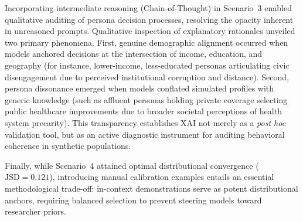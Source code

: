 Incorporating intermediate reasoning (Chain-of-Thought) in Scenario~3 enabled
qualitative auditing of persona decision processes, resolving the opacity
inherent in unreasoned prompts. Qualitative inspection of explanatory rationales
unveiled two primary phenomena. First, genuine demographic alignment occurred
when models anchored decisions at the intersection of income, education, and
geography (for instance, lower-income, less-educated personas articulating civic
disengagement due to perceived institutional corruption and distance). Second,
persona dissonance emerged when models conflated simulated profiles with generic
knowledge (such as affluent personas holding private coverage selecting public
healthcare improvements due to broader societal perceptions of health system
precarity). This transparency establishes XAI not merely as a \textit{post hoc}
validation tool, but as an active diagnostic instrument for auditing behavioral
coherence in synthetic populations.

Finally, while Scenario~4 attained optimal distributional convergence ($\text{JSD} =
0.121$), introducing manual calibration examples entails an essential
methodological trade-off: in-context demonstrations serve as potent
distributional anchors, requiring balanced selection to prevent steering models
toward researcher priors.
